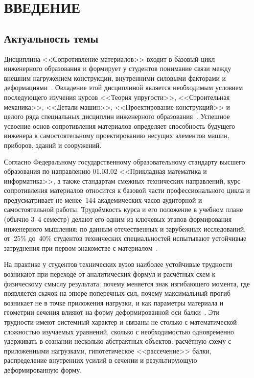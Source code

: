 \section*{ВВЕДЕНИЕ}

\subsection*{Актуальность темы}

Дисциплина <<Сопротивление материалов>> входит в базовый цикл инженерного образования и формирует у студентов понимание связи между внешним нагружением конструкции, внутренними силовыми факторами и деформациями~\cite{feodosev, aleksandrov}. Овладение этой дисциплиной является необходимым условием последующего изучения курсов <<Теория упругости>>, <<Строительная механика>>, <<Детали машин>>, <<Проектирование конструкций>> и целого ряда специальных дисциплин инженерного образования~\cite{timoshenko, darkov}. Успешное усвоение основ сопротивления материалов определяет способность будущего инженера к самостоятельному проектированию несущих элементов машин, приборов, зданий и сооружений.

Согласно Федеральному государственному образовательному стандарту высшего образования по направлению 01.03.02 <<Прикладная математика и информатика>>, а также стандартам смежных технических направлений, курс сопротивления материалов относится к базовой части профессионального цикла и предусматривает не менее~144 академических часов аудиторной и самостоятельной работы. Трудоёмкость курса и его положение в учебном плане (обычно 3--4 семестр) делают его одним из ключевых этапов формирования инженерного мышления: по данным отечественных и зарубежных исследований, от~25\% до~40\% студентов технических специальностей испытывают устойчивые затруднения при первом знакомстве с материалом~\cite{steif2005, philpot2003, makarenko}.

На практике у студентов технических вузов наиболее устойчивые трудности возникают при переходе от аналитических формул и расчётных схем к физическому смыслу результата: почему меняется знак изгибающего момента, где появляется скачок на эпюре поперечных сил, почему максимальный прогиб возникает не в точке приложения нагрузки, и как параметры материала и геометрии сечения влияют на форму деформированной оси балки~\cite{belyaev, pisarenko}. Эти трудности имеют системный характер и связаны не столько с математической сложностью изучаемых уравнений, сколько с необходимостью одновременно удерживать в сознании несколько абстрактных объектов: расчётную схему с приложенными нагрузками, гипотетическое <<рассечение>> балки, распределение внутренних усилий в сечении и результирующую деформированную форму.

